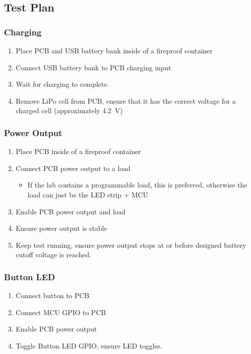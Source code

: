 \documentclass{notes}
\begin{document}
\subsection{Test Plan}

\subsubsection{Charging}

\begin{enumerate}
    \item Place PCB and USB battery bank inside of a fireproof container
    \item Connect USB battery bank to PCB charging input
    \item Wait for charging to complete.
    \item Remove LiPo cell from PCB, ensure that it has the correct voltage for a charged cell (approximately \SI{4.2}{\volt})
\end{enumerate}

\subsubsection{Power Output}

\begin{enumerate}
    \item Place PCB inside of a fireproof container
    \item Connect PCB power output to a load
        \begin{itemize}
            \item If the lab contains a programmable load, this is preferred, otherwise the load can just be the LED strip + MCU
        \end{itemize}
    \item Enable PCB power output and load
    \item Ensure power output is stable
    \item Keep test running, ensure power output stops at or before designed battery cutoff voltage is reached.
\end{enumerate}

\subsubsection{Button LED}

\begin{enumerate}
    \item Connect button to PCB
    \item Connect MCU GPIO to PCB
    \item Enable PCB power output
    \item Toggle Button LED GPIO, ensure LED toggles.
\end{enumerate}
\end{document}
